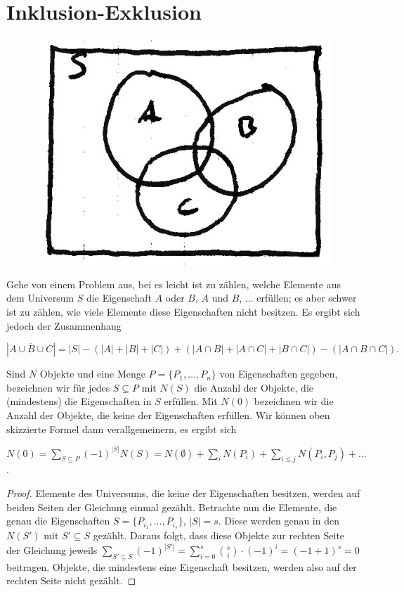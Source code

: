 \chapter{Inklusion-Exklusion}

  \begin{figure}[h]
    \centering
    \includegraphics[width=.25\textwidth]{./Bilder/b03.jpg}
  \end{figure}
  
  Gehe von einem Problem aus, bei es leicht ist zu zählen, welche Elemente aus dem Universum \(S\) die Eigenschaft \(A\) oder \(B\), \(A\) und \(B\), ... erfüllen; es aber schwer ist zu zählen, wie viele Elemente diese Eigenschaften nicht besitzen. Es ergibt sich jedoch der Zusammenhang
  
  \[ | \overline{A \cup B \cup C} | = |S| - ( |A| + |B| + |C| ) + ( |A \cap B| + |A \cap C| + |B \cap C| ) - ( | A \cap B \cap C | ). \]
  
  Sind \(N\) Objekte und eine Menge \(P = \{ P_1,\dots,P_n \}\) von Eigenschaften gegeben, bezeichnen wir für jedes \(S \subseteq P\) mit \(N(S)\) die Anzahl der Objekte, die (mindestens) die Eigenschaften in \(S\) erfüllen. Mit \(N(0)\) bezeichnen wir die Anzahl der Objekte, die keine der Eigenschaften erfüllen. Wir können oben skizzierte Formel dann verallgemeinern, es ergibt sich
  
  \begin{theorem} \label{satzInklSumme}
    \(N(0) = \sum_{S \subseteq P} (-1)^{|S|} N(S) = N(\emptyset) + \sum_i N(P_i) + \sum_{i \leq j} N(P_i, P_j) + ...\).
  \end{theorem}
  
  \begin{proof}
    Elemente des Universums, die keine der Eigenschaften besitzen, werden auf beiden Seiten der Gleichung einmal gezählt. Betrachte nun die Elemente, die genau die Eigenschaften \(S = \{ P_{i_1}, ..., P_{i_s}\}\), \(|S| = s\). Diese werden genau in den \(N(S')\) mit \(S' \subseteq S\) gezählt. Daraus folgt, dass diese Objekte zur rechten Seite der Gleichung jeweils \( \sum_{S' \subseteq S} (-1)^{|S'|} = \sum_{i=0}^s \binom{s}{i} \cdot (-1)^i = (-1 + 1)^s = 0\) beitragen. Objekte, die mindestens eine Eigenschaft besitzen, werden also auf der rechten Seite nicht gezählt.
  \end{proof}
  
